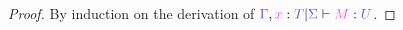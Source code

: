 \begin{proof}
  By induction on the derivation of $\seq{\ty{\Gamma},\tmty{x}{T}}{\ty{\Sigma}}{M}{U}$.
\end{proof}
